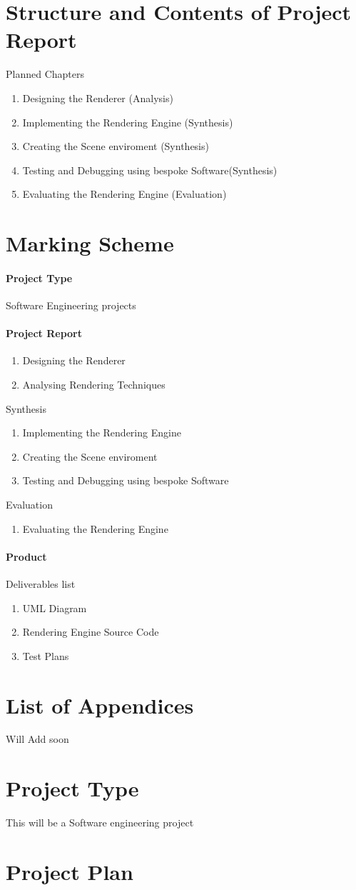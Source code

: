 \documentclass[]{article}
\begin{document}
\section{Structure and Contents of Project Report}
Planned Chapters
\begin{enumerate}
  \item Designing the Renderer (Analysis)
  \item Implementing the Rendering Engine (Synthesis)
  \item Creating the Scene enviroment (Synthesis)
  \item Testing and Debugging using bespoke Software(Synthesis)
  \item Evaluating the Rendering Engine (Evaluation)
\end{enumerate}

\section{Marking Scheme}
\paragraph{Project Type}Software Engineering projects

\paragraph{Project Report} 
\begin{enumerate}
  \item Designing the Renderer
  \item Analysing Rendering Techniques
\end{enumerate}

Synthesis 
\begin{enumerate}
  \item Implementing the Rendering Engine
  \item Creating the Scene enviroment
  \item Testing and Debugging using bespoke Software
\end{enumerate}

Evaluation
\begin{enumerate}
    \item Evaluating the Rendering Engine
\end{enumerate}


\paragraph{Product}
Deliverables list
\begin{enumerate}
    \item UML Diagram
    \item Rendering Engine Source Code 
    \item Test Plans
\end{enumerate}

\section{List of Appendices}
Will Add soon

\section{Project Type}
This will be a Software engineering project
\section{Project Plan}
\noindent
{}
{}
\end{document}

